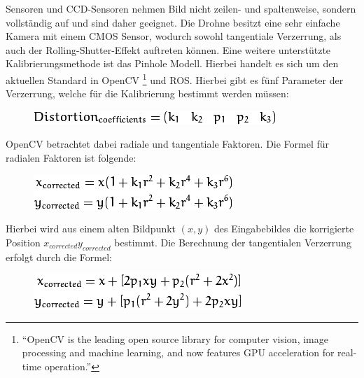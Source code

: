 Sensoren und CCD-Sensoren nehmen Bild nicht zeilen- und spaltenweise, sondern vollständig auf und sind daher geeignet. \newline
Die Drohne besitzt eine sehr einfache Kamera mit einem CMOS Sensor, wodurch sowohl tangentiale Verzerrung, als auch der Rolling-Shutter-Effekt auftreten können. \newline
Eine weitere unterstützte Kalibrierungsmethode ist das Pinhole Modell.
Hierbei handelt es sich um den aktuellen Standard in OpenCV \footnote{``OpenCV is the leading open source library for computer vision, image processing and machine learning, and now features GPU acceleration for real-time operation.''} %
und ROS. Hierbei gibt es fünf Parameter der Verzerrung, welche für die Kalibrierung bestimmt werden müssen:

\begin{figure}[ht]
	\centering
	\includegraphics[scale=0.7]{Bilder/distortion.png}
 	\label{fig:distortion}
\end{figure}

OpenCV betrachtet dabei radiale und tangentiale Faktoren. Die Formel für radialen Faktoren ist folgende:

\begin{figure}[ht]
	\centering
	\includegraphics[scale=0.7]{Bilder/radialFactors.png}
	\label{fig:radial}
\end{figure}

Hierbei wird aus einem alten Bildpunkt $(x,y)$ des Eingabebildes die korrigierte Position $x_{corrected} y_{corrected}$ bestimmt. \newline
Die Berechnung der tangentialen Verzerrung erfolgt durch die Formel:

\begin{figure}[ht]
	\centering
	\includegraphics[scale=0.7]{Bilder/tangentialFactors.png}
	\label{fig:radial}
\end{figure}

